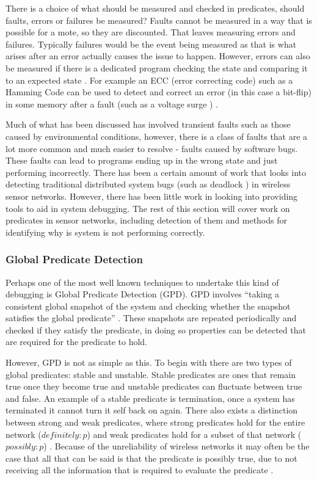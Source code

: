 There is a choice of what should be measured and checked in predicates, should faults, errors or failures be measured? Faults cannot be measured \cite{?} in a way that is possible for a mote, so they are discounted. That leaves measuring errors and failures. Typically failures would be the event being measured \cite{?} as that is what arises after an error actually causes the issue to happen. However, errors can also be measured if there is a dedicated program checking the state and comparing it to an expected state \cite{?}. For example an ECC (error correcting code) such as a Hamming Code can be used to detect and correct an error (in this case a bit-flip) in some memory after a fault (such as a voltage surge ) \cite{hamming1950error}.

Much of what has been discussed has involved transient faults such as those caused by environmental conditions, however, there is a class of faults that are a lot more common and much easier to resolve - faults caused by software bugs. These faults can lead to programs ending up in the wrong state and just performing incorrectly. There has been a certain amount of work that looks into detecting traditional distributed system bugs (such as deadlock \cite{?}) in wireless sensor networks. However, there has been little work in looking into providing tools to aid in system debugging. The rest of this section will cover work on predicates in sensor networks, including detection of them and methods for identifying why is system is not performing correctly.


\subsubsection*{Global Predicate Detection}

Perhaps one of the most well known techniques to undertake this kind of debugging is Global Predicate Detection (GPD). GPD involves ``taking a consistent global snapshot of the system and checking whether the snapshot satisfies the global predicate'' \cite{277788}. These snapshots are repeated periodically and checked if they satisfy the predicate, in doing so properties can be detected that are required for the predicate to hold.

However, GPD is not as simple as this. To begin with there are two types of global predicates: stable and unstable. Stable predicates are ones that remain true once they become true \cite{277788} and unstable predicates can fluctuate between true and false. An example of a stable predicate is termination, once a system has terminated it cannot turn it self back on again. There also exists a distinction between strong and weak predicates, where strong predicates hold for the entire network ($definitely : p$) and weak predicates hold for a subset of that network ($possibly : p$) \cite{553309,345831}. Because of the unreliability of wireless networks it may often be the case that all that can be said is that the predicate is possibly true, due to not receiving all the information that is required to evaluate the predicate \cite{?}.


